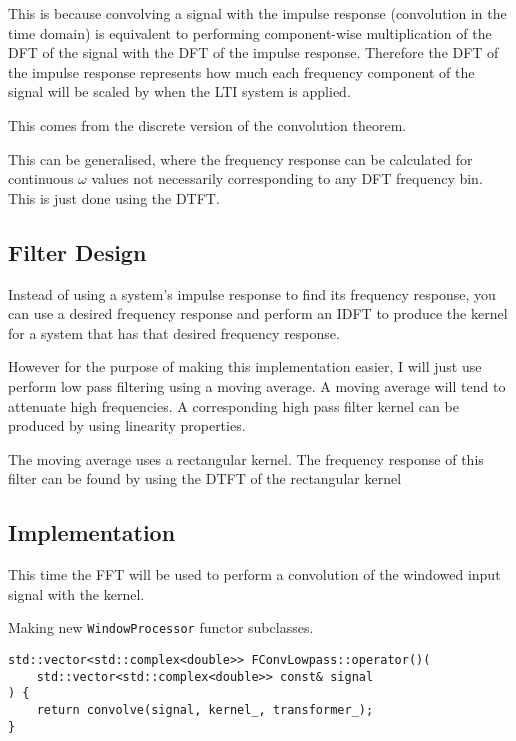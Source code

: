 This is because convolving a signal with the impulse response (convolution in the time domain)
is equivalent to performing component-wise multiplication of the DFT of the signal with the DFT of the impulse response.
Therefore the DFT of the impulse response represents how much each frequency component of the signal will be scaled by
when the LTI system is applied.

This comes from the discrete version of the convolution theorem.

This can be generalised, where the frequency response can be calculated for continuous $\omega$ values 
not necessarily corresponding to any DFT frequency bin. This is just done using the DTFT.

\subsection{Filter Design}
Instead of using a system's impulse response to find its frequency response, 
you can use a desired frequency response and perform an IDFT to produce the 
kernel for a system that has that desired frequency response.

However for the purpose of making this implementation easier, I will just use 
perform low pass filtering using a moving average. A moving average will 
tend to attenuate high frequencies. A corresponding high pass filter kernel can be
produced by using linearity properties.

The moving average uses a rectangular kernel.
The frequency response of this filter can be found by using the DTFT of the rectangular kernel


\subsection{Implementation}
This time the FFT will be used to perform a convolution of the windowed input signal
with the kernel.

Making new \verb|WindowProcessor| functor subclasses.

\begin{verbatim}
std::vector<std::complex<double>> FConvLowpass::operator()(
    std::vector<std::complex<double>> const& signal
) {
    return convolve(signal, kernel_, transformer_);
}
\end{verbatim}